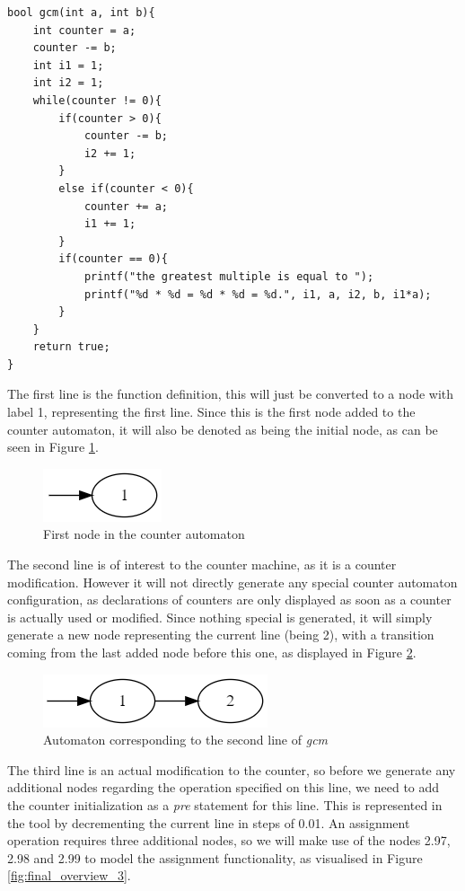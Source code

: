 \documentclass[12pt]{article}
\begin{document}
\begin{lstlisting}[style=CStyle, caption={Example of a more complex function suitable for conversion}, label={lst:final overview}]
bool gcm(int a, int b){
	int counter = a;
	counter -= b;
	int i1 = 1;
	int i2 = 1;
	while(counter != 0){
		if(counter > 0){
			counter -= b;
			i2 += 1;
		}
		else if(counter < 0){
			counter += a;
			i1 += 1;
		}
		if(counter == 0){
			printf("the greatest multiple is equal to ");
			printf("%d * %d = %d * %d = %d.", i1, a, i2, b, i1*a);
		}
	}
	return true;
}
\end{lstlisting}

The first line is the function definition, this will just be converted to a node with label 1, representing the first line. Since this is the first node added to the counter automaton, it will also be denoted as being the initial node, as can be seen in Figure \ref{fig:final_overview_1}.

\begin{figure}[h]
	\centering
	\includegraphics[width=0.2\linewidth]{final_overview_1}
	\caption{First node in the counter automaton}
	\label{fig:final_overview_1}
\end{figure}

The second line is of interest to the counter machine, as it is a counter modification. However it will not directly generate any special counter automaton configuration, as declarations of counters are only displayed as soon as a counter is actually used or modified. Since nothing special is generated, it will simply generate a new node representing the current line (being 2), with a transition coming from the last added node before this one, as displayed in Figure \ref{fig:final_overview_2}.

\begin{figure}[h]
	\centering
	\includegraphics[width=0.4\linewidth]{final_overview_2}
	\caption{Automaton corresponding to the second line of \textit{gcm}}
	\label{fig:final_overview_2}
\end{figure}

The third line is an actual modification to the counter, so before we generate any additional nodes regarding the operation specified on this line, we need to add the counter initialization as a \textit{pre} statement for this line. This is represented in the tool by decrementing the current line in steps of 0.01. An assignment operation requires three additional nodes, so we will make use of the nodes 2.97, 2.98 and 2.99 to model the assignment functionality, as visualised in Figure \ref{fig:final_overview_3}.
\end{document}
